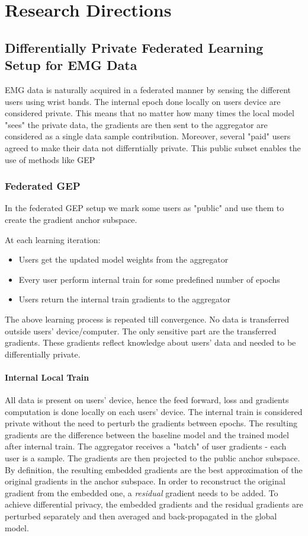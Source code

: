 \chapter{Research Directions}
\section{Differentially Private Federated Learning  Setup for EMG Data }
EMG data is naturally acquired in a federated manner by sensing the different users using wrist bands. The internal epoch done locally on users device are considered private. This means that no matter how many times the local model "sees" the private data, the gradients are then sent to the aggregator are considered as a single data sample contribution. Moreover, several "paid" users agreed to make their data not differntially private. This public subset enables the use of methods like GEP \cite{Yu2021DoLearning} 
\subsection{Federated GEP}
In the federated GEP setup we mark some users as "public" and use them to create the gradient anchor subspace. 

At each learning iteration:
\begin{itemize}
    \item Users get the updated model weights from the aggregator
    \item Every user perform internal train for some predefined number of epochs
    \item Users return the internal train gradients to the aggregator
\end{itemize}
 The above learning process is repeated till convergence. No data is transferred outside users' device/computer. The only sensitive part are the transferred gradients. These gradients reflect knowledge about users' data and needed to be differentially private.
 \subsubsection{Internal Local Train}
 All data is present on users' device, hence the feed forward, loss and gradients computation is done locally on each users' device.
 The internal train is considered private without the need to perturb the gradients between epochs. The resulting gradients are the difference between the baseline model and the trained model after internal train. The aggregator receives a "batch" of user gradients - each user is a sample. The gradients are then projected to the public anchor subspace. By definition, the resulting embedded gradients are the best approximation of the original gradients in the anchor subspace. In order to reconstruct the original gradient from the embedded one, a \textit{residual} gradient needs to be added. To achieve differential privacy, the embedded gradients and the residual gradients are perturbed separately and then averaged and back-propagated in the global model.

